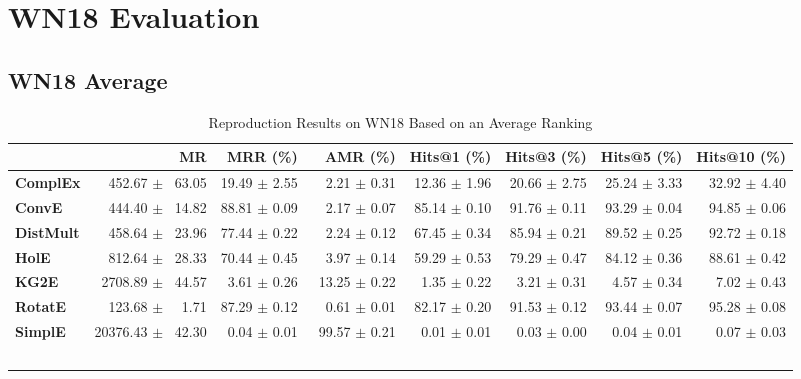 \documentclass[journal]{IEEEtran}
\begin{document}
\section{WN18 Evaluation}
\subsection{WN18 Average}
\begin{table*}
    \caption{Reproduction Results on WN18 Based on an Average Ranking}
    \label{tab:wn18_full_results_average_ranking}
    \centering
    \begin{tabular}{lrrrrrrr}
\toprule
{} &                 MR &      MRR (\%) &       AMR (\%) &   Hits@1 (\%) &   Hits@3 (\%) &   Hits@5 (\%) &  Hits@10 (\%) \\
\midrule
\textbf{ComplEx } &  $\phantom{5}$$\phantom{5}$452.67 $\pm$ $\phantom{5}$63.05 &  19.49 $\pm$ 2.55 &  $\phantom{5}$$\phantom{5}$2.21 $\pm$ 0.31 &  12.36 $\pm$ 1.96 &  20.66 $\pm$ 2.75 &  25.24 $\pm$ 3.33 &  32.92 $\pm$ 4.40 \\
\textbf{ConvE   } &  $\phantom{5}$$\phantom{5}$444.40 $\pm$ $\phantom{5}$14.82 &  88.81 $\pm$ 0.09 &  $\phantom{5}$$\phantom{5}$2.17 $\pm$ 0.07 &  85.14 $\pm$ 0.10 &  91.76 $\pm$ 0.11 &  93.29 $\pm$ 0.04 &  94.85 $\pm$ 0.06 \\
\textbf{DistMult} &  $\phantom{5}$$\phantom{5}$458.64 $\pm$ $\phantom{5}$23.96 &  77.44 $\pm$ 0.22 &  $\phantom{5}$$\phantom{5}$2.24 $\pm$ 0.12 &  67.45 $\pm$ 0.34 &  85.94 $\pm$ 0.21 &  89.52 $\pm$ 0.25 &  92.72 $\pm$ 0.18 \\
\textbf{HolE    } &  $\phantom{5}$$\phantom{5}$812.64 $\pm$ $\phantom{5}$28.33 &  70.44 $\pm$ 0.45 &  $\phantom{5}$$\phantom{5}$3.97 $\pm$ 0.14 &  59.29 $\pm$ 0.53 &  79.29 $\pm$ 0.47 &  84.12 $\pm$ 0.36 &  88.61 $\pm$ 0.42 \\
\textbf{KG2E    } &  $\phantom{5}$2708.89 $\pm$ $\phantom{5}$44.57 &  $\phantom{5}$3.61 $\pm$ 0.26 &  $\phantom{5}$13.25 $\pm$ 0.22 &  $\phantom{5}$1.35 $\pm$ 0.22 &  $\phantom{5}$3.21 $\pm$ 0.31 &  $\phantom{5}$4.57 $\pm$ 0.34 &  $\phantom{5}$7.02 $\pm$ 0.43 \\
\textbf{RotatE  } &  $\phantom{5}$$\phantom{5}$123.68 $\pm$ $\phantom{5}$$\phantom{5}$1.71 &  87.29 $\pm$ 0.12 &  $\phantom{5}$$\phantom{5}$0.61 $\pm$ 0.01 &  82.17 $\pm$ 0.20 &  91.53 $\pm$ 0.12 &  93.44 $\pm$ 0.07 &  95.28 $\pm$ 0.08 \\
\textbf{SimplE  } &  20376.43 $\pm$ $\phantom{5}$42.30 &  $\phantom{5}$0.04 $\pm$ 0.01 &  $\phantom{5}$99.57 $\pm$ 0.21 &  $\phantom{5}$0.01 $\pm$ 0.01 &  $\phantom{5}$0.03 $\pm$ 0.00 &  $\phantom{5}$0.04 $\pm$ 0.01 &  $\phantom{5}$0.07 $\pm$ 0.03 \\
$$
\end{tabular}
\end{table*}
\end{document}
